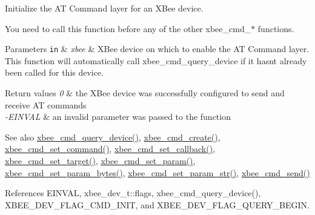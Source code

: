 Initialize the AT Command layer for an X\+Bee device. 

You need to call this function before any of the other xbee\+\_\+cmd\+\_\+$\ast$ functions.


\begin{DoxyParams}[1]{Parameters}
\mbox{\tt in}  & {\em xbee} & X\+Bee device on which to enable the AT Command layer. This function will automatically call xbee\+\_\+cmd\+\_\+query\+\_\+device if it hasn\textquotesingle{}t already been called for this device.\\
\hline
\end{DoxyParams}

\begin{DoxyRetVals}{Return values}
{\em 0} & the X\+Bee device was successfully configured to send and receive AT commands \\
\hline
{\em -\/\+E\+I\+N\+V\+AL} & an invalid parameter was passed to the function\\
\hline
\end{DoxyRetVals}
\begin{DoxySeeAlso}{See also}
\hyperlink{group__xbee__atcmd_ga12317255ca84c2539b7d7a58816eccab}{xbee\+\_\+cmd\+\_\+query\+\_\+device()}, \hyperlink{group__xbee__atcmd_gab73aaf873be6f9e515dcd65748a7f21c}{xbee\+\_\+cmd\+\_\+create()}, \hyperlink{group__xbee__atcmd_ga06181e54a87d90c30108360d6b433323}{xbee\+\_\+cmd\+\_\+set\+\_\+command()}, \hyperlink{group__xbee__atcmd_ga0a5d2e2e87743061c46abd53e379e014}{xbee\+\_\+cmd\+\_\+set\+\_\+callback()}, \hyperlink{group__xbee__atcmd_gae478cb2ea9bb07ade86009a65e6d121f}{xbee\+\_\+cmd\+\_\+set\+\_\+target()}, \hyperlink{group__xbee__atcmd_ga4295dde3673b07f41e569e333abd9730}{xbee\+\_\+cmd\+\_\+set\+\_\+param()}, \hyperlink{group__xbee__atcmd_ga6bd558a2d03eafe29b176f598d76ffd6}{xbee\+\_\+cmd\+\_\+set\+\_\+param\+\_\+bytes()}, \hyperlink{group__xbee__atcmd_ga5b69459e7c47be384c9add2921e507e0}{xbee\+\_\+cmd\+\_\+set\+\_\+param\+\_\+str()}, \hyperlink{group__xbee__atcmd_ga2c58eedef60b41dd30ae1f6b475606a8}{xbee\+\_\+cmd\+\_\+send()} 
\end{DoxySeeAlso}


References E\+I\+N\+V\+AL, xbee\+\_\+dev\+\_\+t\+::flags, xbee\+\_\+cmd\+\_\+query\+\_\+device(), X\+B\+E\+E\+\_\+\+D\+E\+V\+\_\+\+F\+L\+A\+G\+\_\+\+C\+M\+D\+\_\+\+I\+N\+IT, and X\+B\+E\+E\+\_\+\+D\+E\+V\+\_\+\+F\+L\+A\+G\+\_\+\+Q\+U\+E\+R\+Y\+\_\+\+B\+E\+G\+IN.

\mbox{\label{group__xbee__atcmd_gab9fb2f15b9134bd32d937a51e4c68014}} 
